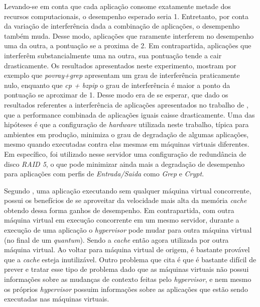 Levando-se em conta que cada aplicação consome exatamente metade dos recursos computacionais, o desempenho esperado seria 1. Entretanto, por conta da variação de interferência dada a combinação de aplicações, o desempenho também muda. Desse modo, aplicações que raramente interferem no desempenho uma da outra, a pontuação se a proxima de 2. Em contrapartida, aplicações que interferêm substancialmente uma na outra, sua pontuação tende a cair drasticamente. Os resultados apresentados neste experimento, mostram por exemplo que \textit{povray+grep} apresentam um grau de interferência praticamente nulo, enquanto que \textit{cp + bzpip} o grau de interferência é maior a ponto da pontuação se aproximar de 1. Desse modo era de se esperar, que dado os resultados referentes a interferência de aplicações apresentados no trabalho de , que a performance combinada de aplicações iguais caisse drasticamente. Uma das hipóteses é que a configuração de \textit{hardware} utilizada neste trabalho, típica para ambientes em produção, minimiza o grau de degradação de algumas aplicações, mesmo quando executadas contra elas mesmas em máquinas virtuais diferentes. Em específico, foi utilizado nesse servidor uma configuração de redundância de disco \textit{RAID 5}, o que pode minimizar ainda mais a degradação de desempenho para aplicações com perfis de \textit{Entrada/Saida} como \textit{Grep} e \textit{Crypt}.

Segundo , uma aplicação executando sem qualquer máquina virtual concorrente, possui os benefícios de se aproveitar da velocidade mais alta da memória \textit{cache} obtendo dessa forma ganhos de desempenho. Em contrapartida, com outra máquina virtual em execução concorrente em um mesmo servidor, durante a execução de uma aplicação o \textit{hypervisor} pode mudar para outra máquina virtual (no final de um \textit{quantum}). Sendo a \textit{cache} então agora utilizada por outra máquina virtual. Ao voltar para máquina virtual de origem, é bastante provável que a  \textit{cache} esteja inutilizável. Outro problema que  cita é que é bastante difícil de prever e tratar esse tipo de problema dado que as máquinas virtuais não possui informações sobre as mudanças de contexto feitas pelo \textit{hypervisor}, e nem mesmo os próprios \textit{hypervisor} possuim informações sobre as aplicações que estão sendo executadas nas máquinas virtuais.

